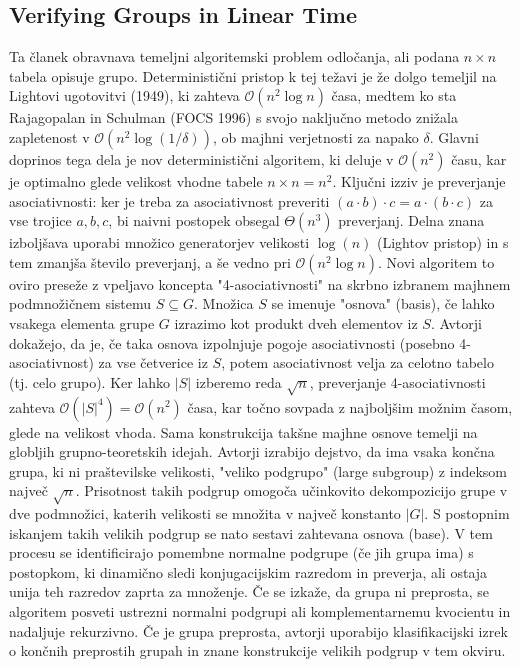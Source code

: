 \subsection{Verifying Groups in Linear Time}

Ta članek obravnava temeljni algoritemski problem odločanja, ali podana \(n \times n\) tabela opisuje grupo. Deterministični pristop k tej težavi je že dolgo temeljil na Lightovi ugotovitvi (1949), ki zahteva \(\mathcal{O}(n^2 \log n)\) časa, medtem ko sta Rajagopalan in Schulman (FOCS 1996) s svojo naključno metodo znižala zapletenost v \(\mathcal{O}(n^2 \log(1/\delta))\), ob majhni verjetnosti za napako \(\delta\). Glavni doprinos tega dela je nov deterministični algoritem, ki deluje v \(\mathcal{O}(n^2)\) času, kar je optimalno glede velikost vhodne tabele \(n \times n=n^2\). 
Ključni izziv je preverjanje asociativnosti: ker je treba za asociativnost preveriti \((a \cdot b) \cdot c = a \cdot (b \cdot c)\) za vse trojice \(a, b, c\), bi naivni postopek obsegal \(\Theta(n^3)\) preverjanj. Delna znana izboljšava uporabi množico generatorjev velikosti \(\log(n)\) (Lightov pristop) in s tem zmanjša število preverjanj, a še vedno pri \(\mathcal{O}(n^2 \log n)\). Novi algoritem to oviro preseže z vpeljavo koncepta "4-asociativnosti" na skrbno izbranem majhnem podmnožičnem sistemu \(S \subseteq G\). Množica \(S\) se imenuje "osnova" (basis), če lahko vsakega elementa grupe \(G\) izrazimo kot produkt dveh elementov iz \(S\). Avtorji dokažejo, da je, če taka osnova izpolnjuje pogoje asociativnosti (posebno 4-asociativnost) za vse četverice iz \(S\), potem asociativnost velja za celotno tabelo (tj. celo grupo). Ker lahko \(|S|\) izberemo reda \(\sqrt{n}\), preverjanje 4-asociativnosti zahteva \(\mathcal{O}(|S|^4) = \mathcal{O}(n^2)\) časa, kar točno sovpada z najboljšim možnim časom, glede na velikost vhoda.
Sama konstrukcija takšne majhne osnove temelji na globljih grupno-teoretskih idejah. Avtorji izrabijo dejstvo, da ima vsaka končna grupa, ki ni praštevilske velikosti, "veliko podgrupo" (large subgroup) z indeksom največ \(\sqrt{n}\). Prisotnost takih podgrup omogoča učinkovito dekompozicijo grupe v dve podmnožici, katerih velikosti se množita v največ konstanto \(|G|\). S postopnim iskanjem takih velikih podgrup se nato sestavi zahtevana osnova (base). V tem procesu se identificirajo pomembne normalne podgrupe (če jih grupa ima) s postopkom, ki dinamično sledi konjugacijskim razredom in preverja, ali ostaja unija teh razredov zaprta za množenje. Če se izkaže, da grupa ni preprosta, se algoritem posveti ustrezni normalni podgrupi ali komplementarnemu kvocientu in nadaljuje rekurzivno. Če je grupa preprosta, avtorji uporabijo klasifikacijski izrek o končnih preprostih grupah in znane konstrukcije velikih podgrup v tem okviru.
